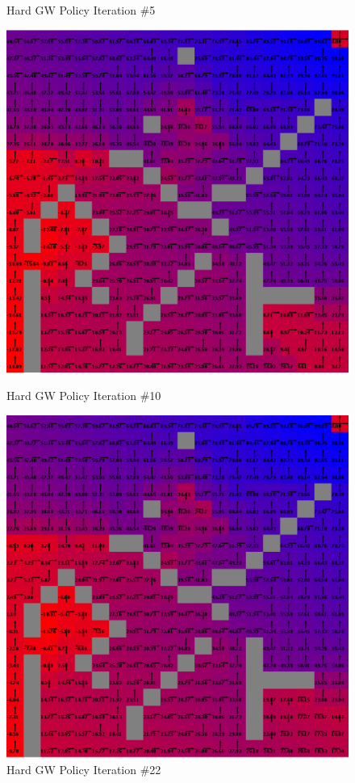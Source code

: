 \documentclass[h]{article}
\begin{document}
\begin{figure}[H]
      \caption*{Hard GW Policy Iteration \#5} 
   \endminipage\hfill
      \includegraphics[width=1\textwidth,keepaspectratio]{hard-policy-10.png} 
      \caption*{Hard GW Policy Iteration \#10} 
   \endminipage\hfill
      \includegraphics[width=1\textwidth,keepaspectratio]{hard-policy-22.png} 
      \caption*{Hard GW Policy Iteration \#22} 
   \endminipage\hfill
\end{figure}
\end{document}
